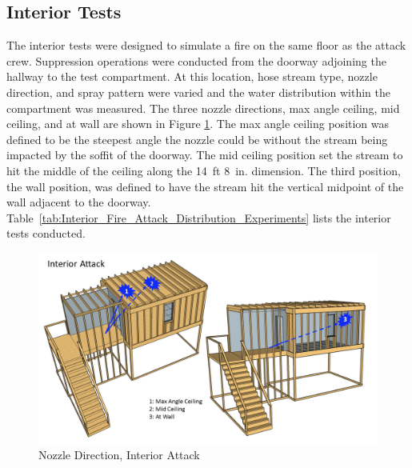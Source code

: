 \documentclass{book}
\begin{document}
\subsection{Interior Tests}
\label{int_tests}
The interior tests were designed to simulate a fire on the same floor as the attack crew. Suppression operations were conducted from the doorway adjoining the hallway to the test compartment. At this location, hose stream type, nozzle direction, and spray pattern were varied and the water distribution within the compartment was measured. The three nozzle directions, max angle ceiling, mid ceiling, and at wall are shown in Figure \ref{fig:Nozzle_Direction_Interior_Attack}. The max angle ceiling position was defined to be the steepest angle the nozzle could be without the stream being impacted by the soffit of the doorway. The mid ceiling position set the stream to hit the middle of the ceiling along the 14~ft 8~in. dimension. The third position, the wall position, was defined to have the stream hit the vertical midpoint of the wall adjacent to the doorway. Table~\ref{tab:Interior_Fire_Attack_Distribution_Experiments} lists the interior tests conducted.

\begin{figure}[!ht]
	\centering
	\includegraphics[width=\columnwidth]{Figures/Water_Distribution/Nozzle_Position_Int}
	\caption{Nozzle Direction, Interior Attack}
	\label{fig:Nozzle_Direction_Interior_Attack}
\end{figure}
\end{document}
